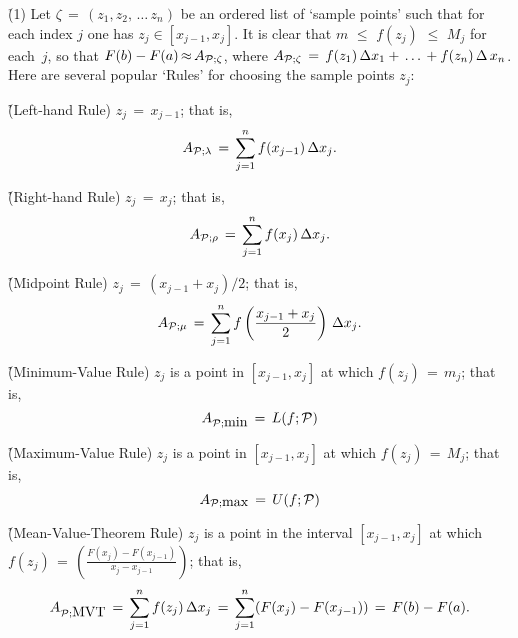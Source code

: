 {\V

        \h (1) Let ${\zeta} \,=\, (z_{1}, z_{2},\,{\ldots}\,z_{n})$ be an ordered list of `sample points'
    such that for each index $j$ one has $z_{j}{\in}[x_{j-1},x_{j}]$. It is clear that $m\,\,{\leq}\,\,f(z_{j})\,\,{\leq}\,\,M_{j}$ for each~$j$, so that
    $F(b) - F(a) \,{\approx}\, A_{{\cal P};{\zeta}}$, where $A_{{\cal P}; {\zeta}} \,=\, f(z_{1})\,{\Delta}x_{1} + \,{\ldots}\, + f(z_{n})\,{\Delta}\,x_{n}$.
    Here are several popular `Rules' for choosing the sample points $z_{j}$:

\VA

        \h \h (Left-hand Rule) $z_{j} \,=\, x_{j-1}$; that is,
        \begin{displaymath}
        A_{{\cal P}; {\lambda}} \,=\, \sum_{j=1}^{n} f(x_{j-1})\,{\Delta}x_{j}.
        \end{displaymath}

        \h \h (Right-hand Rule) $z_{j} \,=\, x_{j}$; that is,
        \begin{displaymath}
        A_{{\cal P}; {\rho}} \,=\, \sum_{j=1}^{n} f(x_{j})\,{\Delta}x_{j}.
        \end{displaymath}

        \h \h (Midpoint Rule) $z_{j} \,=\, (x_{j-1}+x_{j})/2$; that is,
        \begin{displaymath}
        A_{{\cal P}; {\mu}} \,=\, \sum_{j=1}^{n} f\left(\frac{x_{j-1}+x_{j}}{2}\right)\,{\Delta}x_{j}.
        \end{displaymath}

        \h \h (Minimum-Value Rule) $z_{j}$ is a point in $[x_{j-1},x_{j}]$ at which $f(z_{j}) \,=\, m_{j}$; that is,
        \begin{displaymath}
        A_{{\cal P}; \mbox{min}} \,=\, L(f;{\cal P})
        \end{displaymath}

        \h \h (Maximum-Value Rule) $z_{j}$ is a point in $[x_{j-1},x_{j}]$ at which $f(z_{j}) \,=\, M_{j}$; that is,
        \begin{displaymath}
        A_{{\cal P}; \mbox{max}} \,=\, U(f;{\cal P})
        \end{displaymath}

        \h \h (Mean-Value-Theorem Rule) $z_{j}$ is a point in the interval $[x_{j-1},x_{j}]$ at which
    $f(z_{j}) \,=\, {\displaystyle \left(\frac{F(x_{j})-F(x_{j-1})}{x_{j}-x_{j-1}}\right)}$; that is,
        \begin{displaymath}
        A_{{\cal P}; \mbox{MVT}} \,=\, \sum_{j=1}^{n} f(z_{j})\,{\Delta}x_{j} \,=\, 
        \sum_{j=1}^{n} (F(x_{j})-F(x_{j-1})) \,=\, F(b) - F(a).
        \end{displaymath}

}
